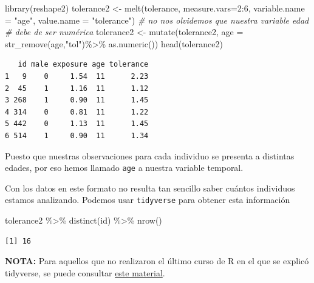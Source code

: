 \documentclass[
]{book}
\newenvironment{Shaded}{\begin{snugshade}}{\end{snugshade}}
\newcommand{\AttributeTok}[1]{\textcolor[rgb]{0.77,0.63,0.00}{#1}}
\newcommand{\CommentTok}[1]{\textcolor[rgb]{0.56,0.35,0.01}{\textit{#1}}}
\newcommand{\DecValTok}[1]{\textcolor[rgb]{0.00,0.00,0.81}{#1}}
\newcommand{\FunctionTok}[1]{\textcolor[rgb]{0.00,0.00,0.00}{#1}}
\newcommand{\NormalTok}[1]{#1}
\newcommand{\OtherTok}[1]{\textcolor[rgb]{0.56,0.35,0.01}{#1}}
\newcommand{\SpecialCharTok}[1]{\textcolor[rgb]{0.00,0.00,0.00}{#1}}
\newcommand{\StringTok}[1]{\textcolor[rgb]{0.31,0.60,0.02}{#1}}
\begin{document}
\begin{Shaded}
\begin{Highlighting}[]
\FunctionTok{library}\NormalTok{(reshape2)}
\NormalTok{tolerance2 }\OtherTok{\textless{}{-}} \FunctionTok{melt}\NormalTok{(tolerance, }\AttributeTok{measure.vars=}\DecValTok{2}\SpecialCharTok{:}\DecValTok{6}\NormalTok{,}
                    \AttributeTok{variable.name =} \StringTok{"age"}\NormalTok{,}
                    \AttributeTok{value.name =} \StringTok{"tolerance"}\NormalTok{)}
\CommentTok{\# no nos olvidemos que nuestra variable edad}
\CommentTok{\# debe de ser numérica}
\NormalTok{tolerance2 }\OtherTok{\textless{}{-}} \FunctionTok{mutate}\NormalTok{(tolerance2, }
                     \AttributeTok{age =} \FunctionTok{str\_remove}\NormalTok{(age,}\StringTok{"tol"}\NormalTok{)}\SpecialCharTok{\%\textgreater{}\%}
                        \FunctionTok{as.numeric}\NormalTok{())}
\FunctionTok{head}\NormalTok{(tolerance2)}
\end{Highlighting}
\end{Shaded}

\begin{verbatim}
   id male exposure age tolerance
1   9    0     1.54  11      2.23
2  45    1     1.16  11      1.12
3 268    1     0.90  11      1.45
4 314    0     0.81  11      1.22
5 442    0     1.13  11      1.45
6 514    1     0.90  11      1.34
\end{verbatim}

Puesto que nuestras observaciones para cada individuo se presenta a distintas edades, por eso hemos llamado \texttt{age} a nuestra variable temporal.

Con los datos en este formato no resulta tan sencillo saber cuántos individuos estamos analizando. Podemos usar \texttt{tidyverse} para obtener esta información

\begin{Shaded}
\begin{Highlighting}[]
\NormalTok{tolerance2 }\SpecialCharTok{\%\textgreater{}\%} 
  \FunctionTok{distinct}\NormalTok{(id) }\SpecialCharTok{\%\textgreater{}\%} 
  \FunctionTok{nrow}\NormalTok{()}
\end{Highlighting}
\end{Shaded}

\begin{verbatim}
[1] 16
\end{verbatim}

\textbf{NOTA:} Para aquellos que no realizaron el último curso de R en el que se explicó tidyverse, se puede consultar \href{https://isglobal-brge.github.io/Aprendizaje_Automatico_1/introducci\%C3\%B3n-a-tidyverse.html}{este material}.
\end{document}
